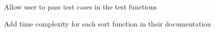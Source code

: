 
\begin{DoxyRefList}
\item[\label{todo__todo000002}%
\hypertarget{todo__todo000002}{}%
File \hyperlink{sort_8c}{sort.c} ]Allow user to pass test cases in the test functions  
\item[\label{todo__todo000001}%
\hypertarget{todo__todo000001}{}%
File \hyperlink{sort_8h}{sort.h} ]Add time complexity for each sort function in their documentation 
\end{DoxyRefList}